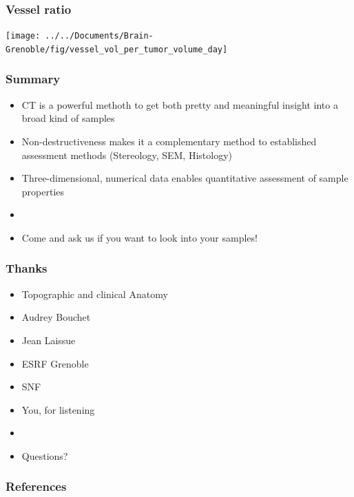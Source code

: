 \documentclass{beamer}					%
\newcommand{\uct}{\si{\micro}CT\xspace}
\begin{document}
\begin{frame}
	\frametitle{Vessel ratio}
	\texttt{[image: ../../Documents/Brain-Grenoble/fig/vessel\_vol\_per\_tumor\_volume\_day]}
\end{frame}

\begin{frame}
	\frametitle{Summary}
	\begin{itemize}
		\item \uct is a powerful methoth to get both pretty and meaningful insight into a broad kind of samples
		\item Non-destructiveness makes it a complementary method to established assessment methods (Stereology, SEM, Histology)
		\item Three-dimensional, numerical data enables quantitative assessment of sample properties
		\item[]
		\pause
		\item Come and ask us if you want to look into your samples!
	\end{itemize}
\end{frame}

\begin{frame}
	\frametitle{Thanks}
	\begin{itemize}
		\item Topographic and clinical Anatomy
		\item Audrey Bouchet
		\item Jean Laissue
		\item ESRF Grenoble
		\item SNF
		\pause
		\item You, for listening
		\item[]
		\pause
		\item Questions?
	\end{itemize}
\end{frame}

\begin{frame}[allowframebreaks]
	\frametitle{References}
	\renewcommand*{\bibfont}{\tiny}
	\printbibliography
\end{frame}
\end{document}
